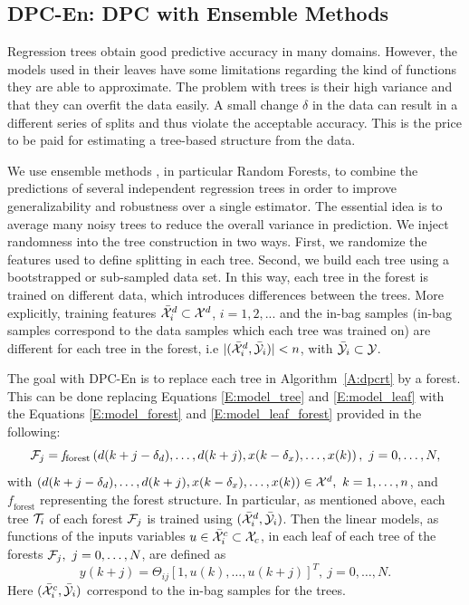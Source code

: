 \subsection{DPC-En: DPC with Ensemble Methods}
\label{SS:dpcrf}
Regression trees obtain good predictive accuracy in many domains. However, the models used in their leaves have some limitations regarding the kind of functions they are able to approximate.
The problem with trees is their high variance and that they can overfit the data easily.
A small change $\delta$ in the data can result in a different series of splits and thus violate the acceptable accuracy.
This is the price to be paid for estimating a tree-based structure from the data.


We use ensemble methods \cite{Friedman2001}, in particular Random Forests, to combine the predictions of several independent regression trees in order to improve generalizability and robustness over a single estimator. 
The essential idea is to average many noisy trees to reduce the overall variance in prediction.
We inject randomness into the tree construction in two ways. First, we randomize the features used to define splitting in each tree.
Second, we build each tree using a bootstrapped or sub-sampled data set.
In this way, each tree in the forest is trained on different data, which introduces differences between the trees.
\textcolor[rgb]{0,0,1}{More explicitly, training features $\bar{\mathcal{X}}^d_i\subset\mathcal{X}^d$, $i=1,2,...$ and the in-bag samples (in-bag samples correspond to the data samples which each tree was trained on) are different for each tree in the forest, i.e $|(\bar {\mathcal{X}}^d_i,\bar{\mathcal{Y}}_i)|<n$, with $\bar{\mathcal{Y}}_i\subset\mathcal{Y}$.}

\textcolor[rgb]{0,0,1}{The goal with DPC-En is to replace each tree in Algorithm~\ref{A:dpcrt} by a forest.
This can be done replacing Equations \eqref{E:model_tree} and \eqref{E:model_leaf} with the Equations \eqref{E:model_forest} and \eqref{E:model_leaf_forest} provided in the following:
\begin{equation}\label{E:model_forest}
\F_j = \mathit{f}_{\mathrm{forest}} \left( d(k+j-\delta_d),\ldots,d(k+j),x(k-\delta_x),\ldots,x(k)  \right),\ j=0,\ldots,N,
\end{equation}
with $\left( d(k+j-\delta_d),\ldots,d(k+j),x(k-\delta_x),\ldots,x(k)  \right)\in\X^d,\ k=1,\ldots,n$, and $\mathit{f}_{\mathrm{forest}}$ representing the forest structure.
In particular, as mentioned above, each tree $\mathcal{T}_i$ of each forest $\mathcal{F}_j$ is trained using $(\bar {\mathcal{X}}^d_i,\bar{\mathcal{Y}}_i)$.
Then the linear models, as functions of the inputs variables $u\in\bar{\mathcal{X}}^c_i\subset\mathcal{X}_c$, in each leaf of each tree of the forests $\F_j,\ j=0,\ldots,N$, are defined as
\begin{equation}\label{E:model_leaf_forest}
y(k+j) =  \Theta_{ij} [1,u(k),\ldots,u(k+j) ]^T,\ j=0,\ldots,N.
\end{equation}
Here $(\bar{\mathcal{X}}^c_i,\bar{\mathcal{Y}}_i)$ correspond to the in-bag samples for the trees.}

